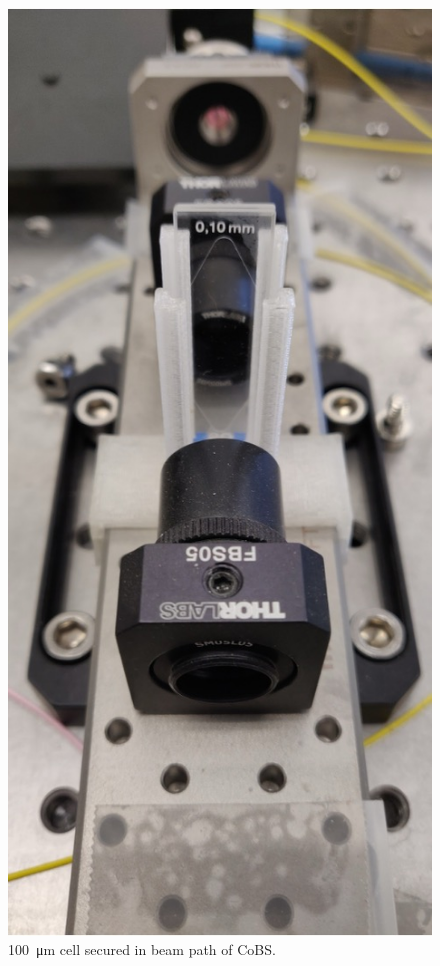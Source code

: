 \begin{figure}[t]
  \centering
  \includegraphics[width=\textwidth]{figs/4-Raman/100umCS2.jpg}
  \caption{\SI{100}{\micro\meter}  cell secured in beam path of \acl{CoBS}.}
  \label{fig:Raman:100umCS2}
\end{figure}

